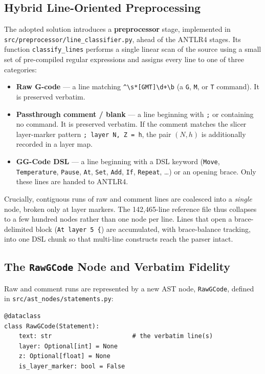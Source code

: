 \subsection*{Hybrid Line-Oriented Preprocessing}

The adopted solution introduces a \textbf{preprocessor} stage, implemented in \texttt{src/preprocessor/line\_classifier.py}, ahead of the ANTLR4 stages. Its function \texttt{classify\_lines} performs a single linear scan of the source using a small set of pre-compiled regular expressions and assigns every line to one of three categories:

\begin{itemize}
    \item[-] \textbf{Raw G-code} --- a line matching \verb|^\s*[GMT]\d+\b| (a \texttt{G}, \texttt{M}, or \texttt{T} command). It is preserved verbatim.
    \item[-] \textbf{Passthrough comment / blank} --- a line beginning with \texttt{;} or containing no command. It is preserved verbatim. If the comment matches the slicer layer-marker pattern \verb|; layer N, Z = h|, the pair $(N, h)$ is additionally recorded in a layer map.
    \item[-] \textbf{GG-Code DSL} --- a line beginning with a DSL keyword (\texttt{Move}, \texttt{Temperature}, \texttt{Pause}, \texttt{At}, \texttt{Set}, \texttt{Add}, \texttt{If}, \texttt{Repeat}, \ldots) or an opening brace. Only these lines are handed to ANTLR4.
\end{itemize}

Crucially, contiguous runs of raw and comment lines are coalesced into a \emph{single} node, broken only at layer markers. The 142{,}465-line reference file thus collapses to a few hundred nodes rather than one node per line. Lines that open a brace-delimited block (\texttt{At layer 5 \{}) are accumulated, with brace-balance tracking, into one DSL chunk so that multi-line constructs reach the parser intact.

\subsection*{The \texttt{RawGCode} Node and Verbatim Fidelity}

Raw and comment runs are represented by a new AST node, \texttt{RawGCode}, defined in \texttt{src/ast\_nodes/statements.py}:

\begin{verbatim}
@dataclass
class RawGCode(Statement):
    text: str                      # the verbatim line(s)
    layer: Optional[int] = None
    z: Optional[float] = None
    is_layer_marker: bool = False
\end{verbatim}

